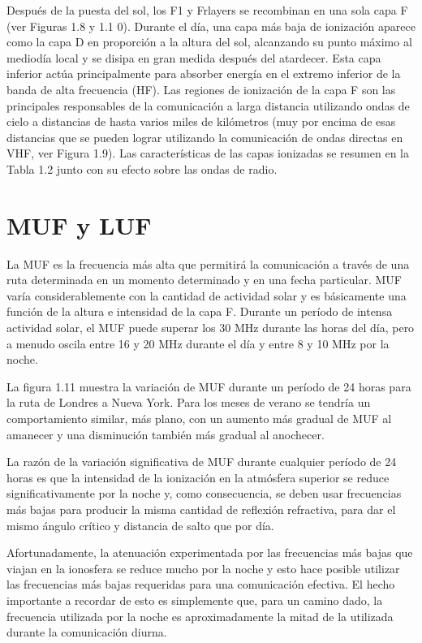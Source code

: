 Después de la puesta del sol, los F1 y Frlayers se recombinan en una sola capa F (ver Figuras 1.8 y 1.1 0). Durante el día, una capa más baja de ionización aparece como la capa D en proporción a la altura del sol, alcanzando su punto máximo al mediodía local y se disipa en gran medida después del atardecer. Esta capa inferior actúa principalmente para absorber energía en el extremo inferior de la banda de alta frecuencia (HF). Las regiones de ionización de la capa F son las principales responsables de la comunicación a larga distancia utilizando ondas de cielo a distancias de hasta varios miles de kilómetros (muy por encima de esas distancias que se pueden lograr utilizando la comunicación de ondas directas en VHF, ver Figura 1.9). Las características de las capas ionizadas se resumen en la Tabla 1.2 junto con su efecto sobre las ondas de radio.


\section{MUF y LUF}
\label{sec:A.09.MUF}

La \ac{MUF} es la frecuencia más alta que permitirá la comunicación a través de una ruta determinada en un momento determinado y en una fecha particular. \ac{MUF} varía considerablemente con la cantidad de actividad solar y es básicamente una función de la altura e intensidad de la capa F. Durante un período de intensa actividad solar, el \ac{MUF} puede superar los 30 MHz durante las horas del día, pero a menudo oscila entre 16 y 20 MHz durante el día y entre 8 y 10 MHz por la noche.

La figura 1.11 muestra la variación de \ac{MUF} durante un período de 24 horas para la ruta de Londres a Nueva York.  Para los meses de verano se tendr\'ia un comportamiento similar, m\'as plano, con un aumento más gradual de \ac{MUF} al amanecer y una disminución tambi\'en más gradual al anochecer.

La razón de la variación significativa de \ac{MUF} durante cualquier período de 24 horas es que la intensidad de la ionización en la atmósfera superior se reduce significativamente por la noche y, como consecuencia, se deben usar frecuencias más bajas para producir la misma cantidad de reflexión refractiva,  para dar el mismo ángulo crítico y distancia de salto que por día.

Afortunadamente, la atenuación experimentada por las frecuencias más bajas que viajan en la ionosfera se reduce mucho por la noche y esto hace posible utilizar las frecuencias más bajas requeridas para una comunicación efectiva. El hecho importante a recordar de esto es simplemente que, para un camino dado, la frecuencia utilizada por la noche es aproximadamente la mitad de la utilizada durante la comunicación diurna.

